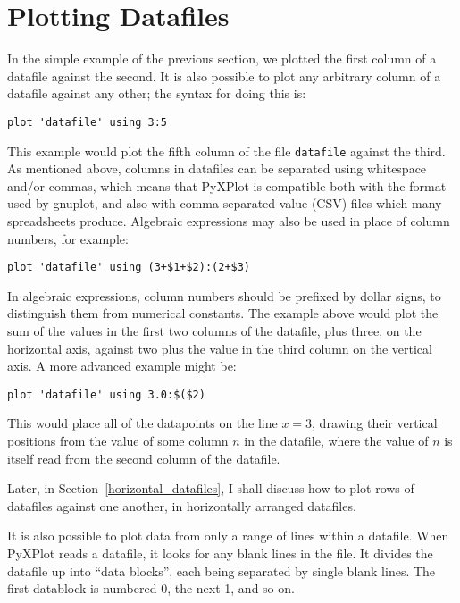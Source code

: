 \documentclass[a4paper,onecolumn,11pt]{book}
\begin{document}
\section{Plotting Datafiles}
\label{plot_datafiles}

In the simple example of the previous section, we plotted the first column of a
datafile against the second. It is also possible to plot any arbitrary column
of a datafile against any other; the syntax for doing this is:

\begin{verbatim}
plot 'datafile' using 3:5
\end{verbatim}

\noindent This example would plot the fifth column of the file
\texttt{datafile} against the third. As mentioned above, columns in datafiles
can be separated using whitespace and/or commas, which means that PyXPlot is
compatible both with the format used by gnuplot, and also with
comma-separated-value (CSV) files which many
spreadsheets produce. Algebraic
expressions may also be used in place of column numbers, for example:

\begin{verbatim}
plot 'datafile' using (3+$1+$2):(2+$3)
\end{verbatim}

\noindent In algebraic expressions, column numbers should be prefixed by dollar
signs, to distinguish them from numerical constants. The example above would
plot the sum of the values in the first two columns of the datafile, plus
three, on the horizontal axis, against two plus the value in the third column
on the vertical axis. A more advanced example might be:

\newpage %

\begin{verbatim}
plot 'datafile' using 3.0:$($2)
\end{verbatim}

\noindent This would place all of the datapoints on the line $x=3$, drawing
their vertical positions from the value of some column $n$ in the datafile,
where the value of $n$ is itself read from the second column of the datafile.

Later, in Section~\ref{horizontal_datafiles}, I shall discuss how to plot rows
of datafiles against one another, in horizontally arranged datafiles.

It is also possible to plot data from only a range of lines within a datafile.
When PyXPlot reads a datafile, it looks for any blank lines in the file. It
divides the datafile up into ``data blocks'', each being separated by single
blank lines. The first datablock is numbered 0, the next 1, and so on.
\end{document}
